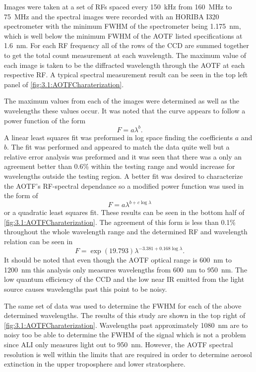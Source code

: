 \documentclass[12pt]{article}
\begin{document}
Images were taken at a set of RFs spaced every 150~kHz from 160~MHz to 75~MHz and the spectral images were recorded with an HORIBA I320 spectrometer with the minimum FWHM of the spectrometer being 1.175~nm, which is well below the minimum FWHM of the AOTF listed specifications at 1.6~nm. For each RF frequency all of the rows of the CCD are summed together to get the total count measurement at each wavelength. The maximum value of each image is taken to be the diffracted wavelength through the AOTF at each respective RF. A typical spectral measurement result can be seen in the top left panel of \autoref{fig:3.1:AOTFCharaterization}.

The maximum values from each of the images were determined as well as the wavelengths these values occur. It was noted that the curve appears to follow a power function of the form
\begin{equation}
    \ F = a\lambda^{b}.
    \label{eqn:3.1:powerFunction}
\end{equation}
A linear least squares fit was preformed in log space finding the coefficients $a$ and $b$. The fit was performed and appeared to match the data quite well but a relative error analysis was preformed and it was seen that there was a only an agreement better than 0.6\% within the testing range and would increase for wavelengths outside the testing region. A better fit was desired to characterize the AOTF's RF-spectral dependance so a modified power function was used in the form of
 \begin{equation}
    \ F = a\lambda^{b+c\log\lambda}
    \label{eqn:3.1:modifiedPowerFunction}
\end{equation}
or a quadratic least squares fit. These results can be seen in the bottom half of \autoref{fig:3.1:AOTFCharaterization}. The agreement of this form is less than 0.1\% throughout the whole wavelength range and the determined RF and wavelength relation can be seen in
\begin{equation}
    \ F = \exp{(19.793)}\lambda^{-3.381+0.168\log\lambda}.
    \label{eqn:3.1:modifiedPowerFunctionCoeffiecicents}
\end{equation}
It should be noted that even though the AOTF optical range is 600~nm to 1200~nm this analysis only measures wavelengths from 600~nm to 950~nm. The low quantum efficiency of the CCD and the low near IR emitted from the light source causes wavelengths past this point to be noisy.

The same set of data was used to determine the FWHM for each of the above determined wavelengths. The results of this study are shown in the top right of \autoref{fig:3.1:AOTFCharaterization}. Wavelengths past approximately 1080~nm are to noisy too be able to determine the FWHM of the signal which is not a problem since ALI only measures light out to 950~nm. However, the AOTF spectral resolution is well within the limits that are required in order to determine aerosol extinction in the upper troposphere and lower stratosphere.
\end{document}
